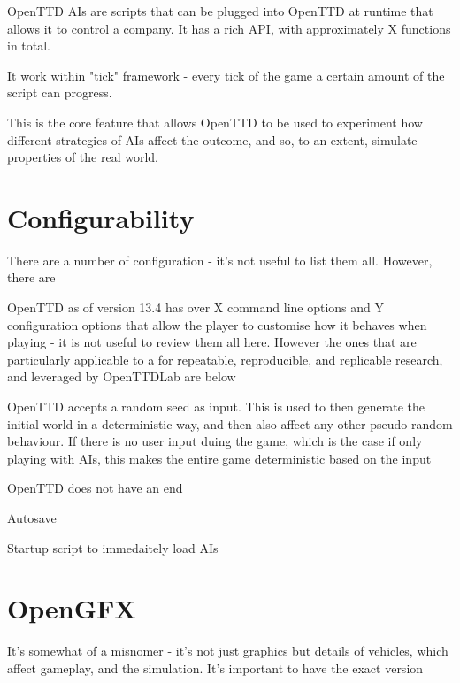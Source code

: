 \documentclass[logo,msc,dsti]{infthesis}    %
\begin{document}
OpenTTD AIs are scripts that can be plugged into OpenTTD at runtime that allows it to control a company. It has a rich API, with approximately X functions in total.

It work within "tick" framework - every tick of the game a certain amount of the script can progress.

This is the core feature that allows OpenTTD to be used to experiment how different strategies of AIs affect the outcome, and so, to an extent, simulate properties of the real world.

\section{Configurability}

There are a number of configuration - it's not useful to list them all. However, there are 

OpenTTD as of version 13.4 has over X command line options and Y configuration options that allow the player to customise how it behaves when playing - it is not useful to review them all here. However the ones that are particularly applicable to a for repeatable, reproducible, and replicable research, and leveraged by OpenTTDLab are below

\begin{itemize}
\begin{item}
OpenTTD accepts a random seed as input. This is used to then generate the initial world in a deterministic way, and then also affect any other pseudo-random behaviour. If there is no user input duing the game, which is the case if only playing with AIs, this makes the entire game deterministic based on the input
\end{item}
\begin{item}
OpenTTD does not have an end
\end{item}
\begin{item}
Autosave
\end{item}
\begin{item}
Startup script to immedaitely load AIs 
\end{item}
\end{itemize}


\section{OpenGFX}

It's somewhat of a misnomer - it's not just graphics but details of vehicles, which affect gameplay, and the simulation. It's important to have the exact version
\end{document}
